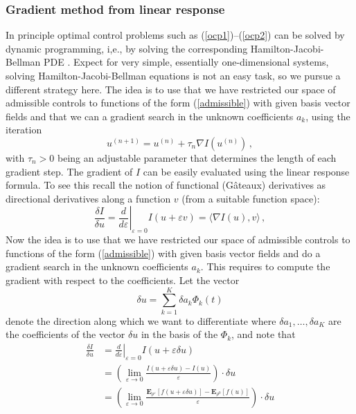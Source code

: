 \documentclass[]{tMPH2e}
\newcommand{\eps}{\varepsilon}
\newcommand{\bE}{{\mathbf E}}
\newcommand{\wrt}{with respect to }
\begin{document}
\subsubsection*{Gradient method from linear response}

In principle optimal control problems such as (\ref{ocp1})--(\ref{ocp2}) can be solved by dynamic programming, i,e., by solving the corresponding Hamilton-Jacobi-Bellman PDE \cite{fleming2006}. Expect for very simple, essentially one-dimensional systems, solving Hamilton-Jacobi-Bellman equations is not an easy task, so we pursue a different strategy here. The idea is to use that we have restricted our space of admissible controls to functions of the form (\ref{admissible}) with given basis vector fields and that we can a gradient search in the unknown coefficients $a_{k}$, using the iteration
\[
u^{(n+1)} = u^{(n)} + \tau_{n}\nabla I(u^{(n)})\,,
\]
with $\tau_{n}>0$ being an adjustable parameter that determines the length of each gradient step. The gradient of $I$ can be easily evaluated using the linear response formula. To see this recall the notion of functional (G\^ateaux) derivatives as directional derivatives along a function $v$ (from a suitable function space): 
\begin{equation*}
\frac{\delta I}{\delta u} = \left.\frac{d}{d\eps}\right|_{\eps=0} I(u+\eps v) = \langle\nabla I(u),v\rangle\,,
\end{equation*} 
Now the idea is to use that we have restricted our space of admissible controls to functions of the form (\ref{admissible}) with given basis vector fields and do a gradient search in the unknown coefficients $a_{k}$. This requires to compute the gradient \wrt the coefficients. Let the vector  
\[
\delta u = \sum_{k=1}^K \delta a_k \Phi_k(t)
\]   
denote the direction along which we want to differentiate where $\delta a_{1},\ldots,\delta a_{K}$ are the coefficients of the vector $\delta u$ in the basis of the $\Phi_{k}$, and note that 
\begin{equation*}
\begin{aligned}
\frac{\delta I}{\delta u} & = \left.\frac{d}{d\eps}\right|_{\eps=0} I(u+\eps \delta u)\\
& = \left(\lim_{\eps\to 0}\frac{I(u+\eps\delta u) - I(u)}{\eps}\right)\cdot \delta u\\
& = \left(\lim_{\eps\to 0}\frac{\bE_{\rho^{\eps}}[f(u+\eps \delta u)] - \bE_{\rho^{0}}[f(u)]}{\eps}\right)\cdot\delta u\\
\end{aligned}
\end{equation*} 
\end{document}
